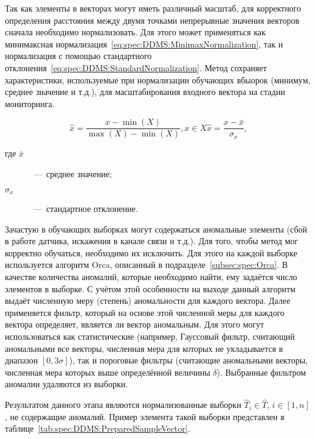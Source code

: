 Так как элементы в векторах могут иметь различный масштаб, для корректного определения расстояния между двумя точками непрерывные значения векторов сначала необходимо нормализовать. Для этого может применяться как минимаксная нормализация~\eqref{eq:spec:DDMS:MinimaxNormalization}, так и нормализация с помощью стандартного отклонения~\eqref{eq:spec:DDMS:StandardNormalization}. Метод сохраняет характеристики, используемые при нормализации обучающих вбыорок (минимум, среднее значение и т.д.), для масштабирования входного вектора на стадии мониторинга.

\begin{subequations}
\begin{equation} \label{eq:spec:DDMS:MinimaxNormalization}
\hat{x} = \frac{x - \min(X)}{\max(X) - \min(X)}, x\in X
\end{equation}
\begin{equation} \label{eq:spec:DDMS:StandardNormalization}
\hat{x} = \frac{x - \bar{x}}{\sigma_x} \text{,}
\end{equation}
\end{subequations}
\begin{description}
	\item[где $\bar{x}$]~---~среднее значение;
	\item[$\sigma_x$]~---~стандартное отклонение.
\end{description}

Зачастую в обучающих выборках могут содержаться аномальные элементы (сбой в работе датчика, искажения в канале связи и т.д.). Для того, чтобы метод мог корректно обучаться, необходимо их исключить. Для этого на каждой выборке используется алгоритм Orca, описанный в подразделе~\ref{subsec:spec:Orca}. В качестве количества аномалий, которые необходимо найти, ему задаётся число элементов в выборке. С учётом этой особенности на выходе данный алгоритм выдаёт численную меру (степень) аномальности для каждого вектора. Далее применяется фильтр, который на основе этой численной меры для каждого вектора определяет, является ли вектор аномальным. Для этого могут использоваться как статистические (например, Гауссовый фильтр, считающий аномальными все векторы, численная мера для которых не укладывается в диапазон $[0, 3\sigma]$), так и пороговые фильтры (считающие аномальными векторы, численная мера которых выше определённой величины $\delta$). Выбранные фильтром аномалии удаляются из выборки.

Результатом данного этапа являются нормализованные выборки $\hat{T}_i\in \hat{T}$, $i\in \left[1,n\right]$, не содержащие аномалий. Пример элемента такой выборки представлен в таблице~\ref{tab:spec:DDMS:PreparedSampleVector}.

